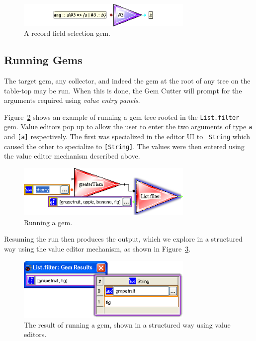 \documentclass[preprint]{sigplanconf}
\begin{document}
\begin{figure}[htb]
  \centering
  \includegraphics[width=20pc]{recordFieldSelection.png}
  \caption{A record field selection gem.}
  \label{fig:recordFieldSelection}
\end{figure}

\subsection{Running Gems}
\label{sec:runningGems}

The target gem, any collector, and indeed the gem at the root of any
tree on the table-top may be run. When this is done, the Gem Cutter
will prompt for the arguments required using {\it value entry panels}.

Figure~\ref{fig:runningGems-a} shows an example of running a gem tree
rooted in the {\tt List.filter} gem. Value editors pop up to allow the
user to enter the two arguments of type {\tt a} and {\tt [a]}
respectively. The first was specialized in the editor UI to {\tt
String} which caused the other to specialize to {\tt [String]}. The
values were then entered using the value editor mechanism described
above.

\begin{figure}[htb]
  \centering
  \includegraphics[width=20pc]{runningGems-a.png}
  \caption{Running a gem.}
  \label{fig:runningGems-a}
\end{figure}

Resuming the run then produces the output, which we explore in a structured
way using the value editor mechanism, as shown in
Figure~\ref{fig:runningGems-b}.

\begin{figure}[htb]
  \centering
  \includegraphics[width=20pc]{runningGems-b.png}
  \caption{The result of running a gem, shown in a structured way using value editors.}
  \label{fig:runningGems-b}
\end{figure}
\end{document}
